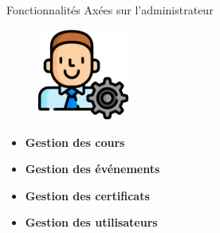 \begin{frame}{Fonctionnalités Axées sur l'administrateur}
    \begin{figure}[H]
        \centering
        \includegraphics[height=3cm]{assets/images/admin.png}
    \end{figure}

    \begin{itemize}
        \setlength\itemsep{0.8em} %

        \item \textbf{Gestion des cours}
        \item \textbf{Gestion des événements}
        \item \textbf{Gestion des certificats}
        \item \textbf{Gestion des utilisateurs}
    \end{itemize}

\end{frame}
